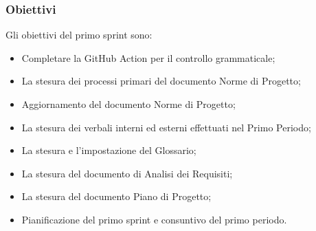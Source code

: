 \subsubsection{Obiettivi}

Gli obiettivi del primo sprint sono:
\begin{itemize}
    \item Completare la GitHub Action per il controllo grammaticale;
    \item La stesura dei processi primari del documento Norme di Progetto;
    \item Aggiornamento del documento Norme di Progetto;
    \item La stesura dei verbali interni ed esterni effettuati nel Primo Periodo;
    \item La stesura e l'impostazione del Glossario;
    \item La stesura del documento di Analisi dei Requisiti;
    \item La stesura del documento Piano di Progetto;
    \item Pianificazione del primo sprint e consuntivo del primo periodo.
\end{itemize}